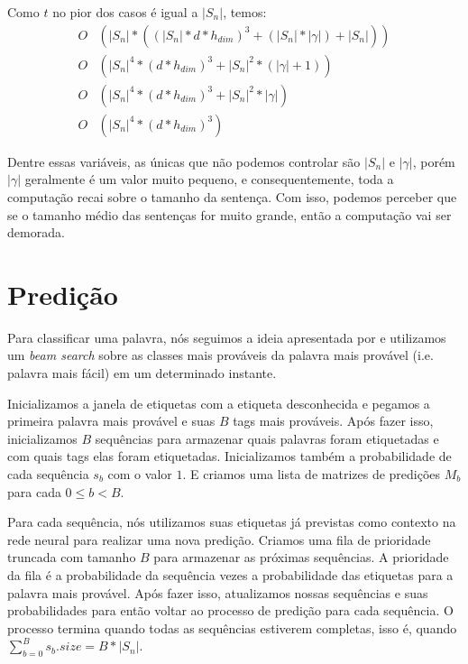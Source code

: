 Como $t$ no pior dos casos é igual a $|S_n|$, temos:
\begin{align} 
O&(|S_n| * ((|S_n|*d*h_{dim})^3 + (|S_n| * |\gamma|) + |S_n|)) \nonumber \\
O&(|S_n|^4 * (d*h_{dim})^3 + |S_n|^2*(|\gamma| + 1)) \nonumber \\
O&(|S_n|^4 * (d*h_{dim})^3 + |S_n|^2*|\gamma|) \nonumber \\
O&(|S_n|^4 * (d*h_{dim})^3) \nonumber
\end{align}

Dentre essas variáveis, as únicas que não podemos controlar são $|S_n|$ e $|\gamma|$, porém $|\gamma|$ geralmente é um valor muito pequeno, e consequentemente, toda a computação recai sobre o tamanho da sentença. Com isso, podemos perceber que se o tamanho médio das sentenças for muito grande, então a computação vai ser demorada. 





\section{Predição}

Para classificar uma palavra, nós seguimos a ideia apresentada por \cite{shen2007guided} e utilizamos um \textit{beam search} sobre as classes mais prováveis da palavra mais provável (i.e. palavra mais fácil) em um determinado instante.

Inicializamos a janela de etiquetas com a etiqueta desconhecida e pegamos a primeira palavra mais provável e suas $B$ tags mais prováveis. Após fazer isso, inicializamos $B$ sequências para armazenar quais palavras foram etiquetadas e com quais tags elas foram etiquetadas. Inicializamos também a probabilidade de cada sequência $s_b$ com o valor $1$. E criamos uma lista de matrizes de predições $M_b$ para cada $0 \leq b < B$.

Para cada sequência, nós utilizamos suas etiquetas já previstas como contexto na rede neural para realizar uma nova predição. Criamos uma fila de prioridade truncada com tamanho $B$ para armazenar as próximas sequências. A prioridade da fila é a probabilidade da sequência vezes a probabilidade das etiquetas para a palavra mais provável. Após fazer isso, atualizamos nossas sequências e suas probabilidades para então voltar ao processo de predição para cada sequência. O processo termina quando todas as sequências estiverem completas, isso é, quando $\sum_{b=0}^{B}s_b.size = B*|S_n|$. 

